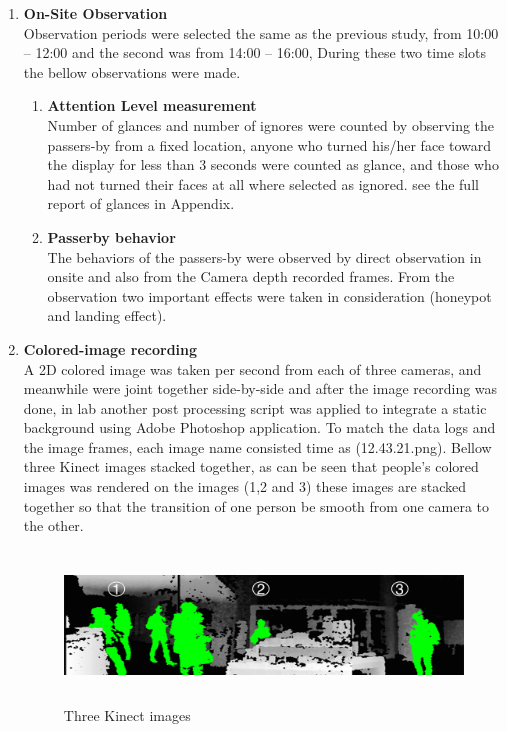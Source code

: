 \begin{enumerate}
\item \textbf{On-Site Observation} \\
Observation periods were selected the same as the previous study, from 10:00 – 12:00 and the second was from 14:00 – 16:00, During these two time slots the bellow observations were made.

\begin{enumerate}
\item \textbf{Attention Level measurement} \\
Number of glances and number of ignores were counted by observing the passers-by from a fixed location, anyone who turned his/her face toward the display for less than 3 seconds were counted as glance, and those who had not turned their faces at all where selected as ignored. see the full report of glances in Appendix.

\item \textbf{Passerby behavior} \\
The behaviors of the passers-by were observed by direct observation in onsite and also from the Camera depth recorded frames. From the observation two important effects were taken in consideration (honeypot and landing effect).


\end{enumerate}

\item \textbf{Colored-image recording} \\
A 2D colored image was taken per second from each of three cameras, and meanwhile were joint together side-by-side and after the image recording was done, in lab another post processing script was applied to integrate a static background using Adobe Photoshop application. To match the data logs and the image frames, each image name consisted time as (12.43.21.png).
Bellow three Kinect images stacked together, as can be seen that people's colored images was rendered on the images (1,2 and 3) these images are stacked together so that the transition of one person be smooth from one camera to the other.


\begin{minipage}{0.95\textwidth}
\begin{flushright}
\begin{figure}[H]
   \centering
    \includegraphics[width=\textwidth,height=40mm]{Figures/9/stacked_image}%
    \caption{Three Kinect images}%
    \label{fig:threekinectimages}%
\end{figure}
\end{flushright}
\end{minipage}


\end{enumerate}

